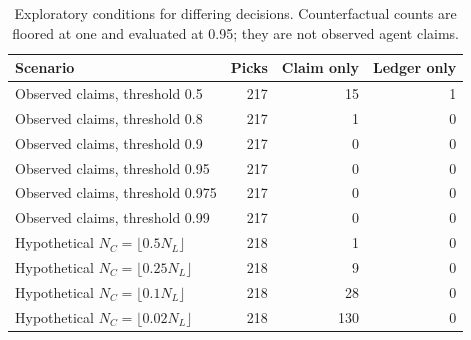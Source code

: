 \begin{table}[tbp]
\centering\small
\setlength{\tabcolsep}{4pt}
\caption{Exploratory conditions for differing decisions. Counterfactual counts are floored at one and evaluated at 0.95; they are not observed agent claims.}\label{tab:sensitivity}
\begin{tabular}{lrrr}
\toprule
Scenario & Picks & Claim only & Ledger only \\
\midrule
Observed claims, threshold 0.5 & 217 & 15 & 1 \\
Observed claims, threshold 0.8 & 217 & 1 & 0 \\
Observed claims, threshold 0.9 & 217 & 0 & 0 \\
Observed claims, threshold 0.95 & 217 & 0 & 0 \\
Observed claims, threshold 0.975 & 217 & 0 & 0 \\
Observed claims, threshold 0.99 & 217 & 0 & 0 \\
Hypothetical $N_C=\lfloor 0.5N_L\rfloor$ & 218 & 1 & 0 \\
Hypothetical $N_C=\lfloor 0.25N_L\rfloor$ & 218 & 9 & 0 \\
Hypothetical $N_C=\lfloor 0.1N_L\rfloor$ & 218 & 28 & 0 \\
Hypothetical $N_C=\lfloor 0.02N_L\rfloor$ & 218 & 130 & 0 \\
\bottomrule
\end{tabular}
\end{table}

